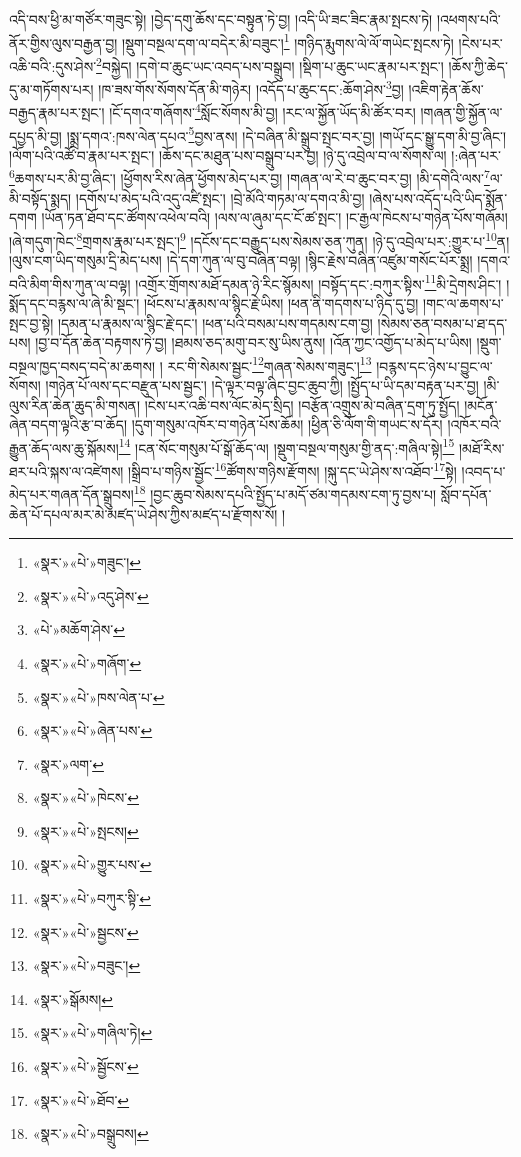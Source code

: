 འདི་བས་ཕྱི་མ་གཙོར་གཟུང་སྟེ། །བྱེད་དགུ་ཆོས་དང་བསྟུན་ཏེ་བྱ། །འདི་ཡི་ཟང་ཟིང་རྣམ་སྤངས་ཏེ། །འཕགས་པའི་ནོར་གྱིས་ལུས་བརྒྱན་བྱ། །སྡུག་བསྔལ་དག་ལ་བདེར་མི་བཟུང་།\footnote{«སྣར་»«པེ་»གཟུང་།} །གཉིད་རྨུགས་ལེ་ལོ་གཡེང་སྤངས་ཏེ། །ངེས་པར་འཆི་བའི་:དུས་ཤེས་\footnote{«སྣར་»«པེ་»འདུ་ཤེས་}བསྐྱེད། །དགེ་བ་ཆུང་ཡང་འབད་པས་བསྒྲུབ། །སྡིག་པ་ཆུང་ཡང་རྣམ་པར་སྤང་། །ཆོས་ཀྱི་ཆེད་དུ་མ་གཏོགས་པར། །ཁ་ཟས་གོས་སོགས་དོན་མི་གཉེར། །འདོད་པ་ཆུང་དང་:ཆོག་ཤེས་\footnote{«པེ་»མཆོག་ཤེས་}བྱ། །འཇིག་རྟེན་ཆོས་བརྒྱད་རྣམ་པར་སྤང་། །ངོ་དགའ་གཞོགས་\footnote{«སྣར་»«པེ་»གཞོག་}སློང་སོགས་མི་བྱ། །རང་ལ་སྐྱོན་ཡོད་མི་ཚོར་བར། །གཞན་གྱི་སྐྱོན་ལ་དཔྱད་མི་བྱ། །སྨྲ་དགའ་:ཁས་ལེན་དཔའ་\footnote{«སྣར་»«པེ་»ཁས་ལེན་པ་}བྱས་ནས། །དེ་བཞིན་མི་སྒྲུབ་སྤང་བར་བྱ། །གཡོ་དང་སྒྱུ་དག་མི་བྱ་ཞིང་། །ལོག་པའི་འཚོ་བ་རྣམ་པར་སྤང་། །ཆོས་དང་མཐུན་པས་བསྒྲུབ་པར་བྱ། །ཉེ་དུ་འབྲེལ་བ་ལ་སོགས་ལ། །:ཞེན་པར་\footnote{«སྣར་»«པེ་»ཞེན་པས་}ཆགས་པར་མི་བྱ་ཞིང་། །ཕྱོགས་རིས་ཞེན་ཕྱོགས་མེད་པར་བྱ། །གཞན་ལ་རེ་བ་ཆུང་བར་བྱ། །མི་དགེའི་ལས་\footnote{«སྣར་»ལག་}ལ་མི་བསྟོད་སྨད། །དགོས་པ་མེད་པའི་འདུ་འཛི་སྤང་། །བྲེ་མོའི་གཏམ་ལ་དགའ་མི་བྱ། །ཞེས་པས་འདོད་པའི་ཡིད་སྨོན་དགག །ཡོན་ཏན་ཐོབ་དང་ཚོགས་འཕེལ་བའི། །ལས་ལ་ཞུམ་དང་ངོ་ཚ་སྤང་། །ང་རྒྱལ་ཁེངས་པ་གཉེན་པོས་གཞོམ། །ཞེ་གདུག་ཁེང་\footnote{«སྣར་»«པེ་»ཁེངས་}གྲགས་རྣམ་པར་སྤང་།\footnote{«སྣར་»«པེ་»སྤངས།} །དངོས་དང་བརྒྱུད་པས་སེམས་ཅན་ཀུན། །ཉེ་དུ་འབྲེལ་པར་:གྱུར་པ་\footnote{«སྣར་»«པེ་»གྱུར་པས་}ན། །ལུས་ངག་ཡིད་གསུམ་དྲི་མེད་པས། །དེ་དག་ཀུན་ལ་བུ་བཞིན་བལྟ། །སྙིང་རྗེས་བཞིན་འཛུམ་གསོང་པོར་སྨྲ། །དགའ་བའི་མིག་གིས་ཀུན་ལ་བལྟ། །འགྲོར་གྲོགས་མཐོ་དམན་ཉེ་རིང་སྙོམས། །བསྟོད་དང་:བཀུར་སྟིས་\footnote{«སྣར་»«པེ་»བཀུར་སྟི་}མི་དྲེགས་ཤིང་། །སྨོད་དང་བརྙས་ལ་ཞེ་མི་སྡང་། །ཕོངས་པ་རྣམས་ལ་སྙིང་རྗེ་ཡིས། །ཕན་ནི་གདགས་པ་ཉིད་དུ་བྱ། །གང་ལ་ཆགས་པ་སྤང་བྱ་སྟེ། །དམན་པ་རྣམས་ལ་སྙིང་རྗེ་དང་། །ཕན་པའི་བསམ་པས་གདམས་ངག་བྱ། །སེམས་ཅན་བསམ་པ་ཐ་དད་པས། །བྱ་བ་དོན་ཆེན་བརྟགས་ཏེ་བྱ། །ཐམས་ཅད་མགུ་བར་སུ་ཡིས་ནུས། །འོན་ཀྱང་འགྱོད་པ་མེད་པ་ཡིས། །སྡུག་བསྔལ་ཁྱད་བསད་བདེ་མ་ཆགས། །
རང་གི་སེམས་སྦྱང་\footnote{«སྣར་»«པེ་»སྦྱངས་}གཞན་སེམས་གཟུང་།\footnote{«སྣར་»«པེ་»བཟུང་།} །བརྙས་དང་ཉེས་པ་བྱུང་ལ་སོགས། །གཉེན་པོ་ལས་དང་བརྫུན་པས་སྦྱང་། །དེ་ལྟར་བལྟ་ཞིང་བྱང་ཆུབ་ཀྱི། །སྤྱོད་པ་ཡི་དམ་བརྟན་པར་བྱ། །མི་ལུས་རིན་ཆེན་ཆུད་མི་གསན། །ངེས་པར་འཆི་བས་ལོང་མེད་སྲིད། །བརྩོན་འགྲུས་མེ་བཞིན་དྲག་ཏུ་སྤྱོད། །མངོན་ཞེན་བདག་ལྟའི་རྩ་བ་ཆོད། །དུག་གསུམ་འཁོར་བ་གཉེན་པོས་ཆོམ། །ཕྱིན་ཅི་ལོག་གི་གཡང་ས་དོར། །འཁོར་བའི་རྒྱུན་ཆོད་ལས་ཆུ་སྐོམས།\footnote{«སྣར་»སྒོམས།} །ངན་སོང་གསུམ་པོ་སྒོ་ཆོད་ལ། །སྡུག་བསྔལ་གསུམ་གྱི་ནད་:གཞིལ་སྟེ།\footnote{«སྣར་»«པེ་»གཞིལ་ཏེ།} །མཐོ་རིས་ཐར་པའི་སྐས་ལ་འཛེགས། །སྒྲིབ་པ་གཉིས་སྦྱོང་\footnote{«སྣར་»«པེ་»སྦྱོངས་}ཚོགས་གཉིས་རྫོགས། །སྐུ་དང་ཡེ་ཤེས་ས་འཐོབ་\footnote{«སྣར་»«པེ་»ཐོབ་}སྟེ། །འབད་པ་མེད་པར་གཞན་དོན་སྒྲུབས།\footnote{«སྣར་»«པེ་»བསྒྲུབས།} །བྱང་ཆུབ་སེམས་དཔའི་སྤྱོད་པ་མདོ་ཙམ་གདམས་ངག་ཏུ་བྱས་པ། སློབ་དཔོན་ཆེན་པོ་དཔལ་མར་མེ་མཛད་ཡེ་ཤེས་ཀྱིས་མཛད་པ་རྫོགས་སོ། ། 